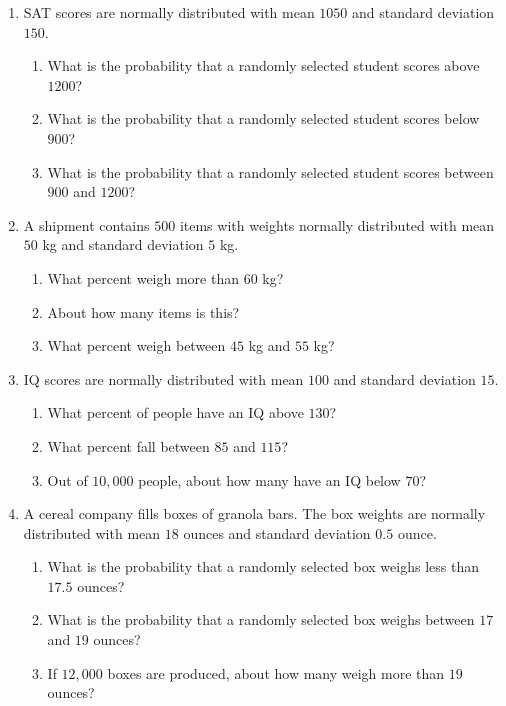 \documentclass[11pt]{article}
\newcommand{\answerline}{\vspace{1.2cm}}
\begin{document}
\begin{enumerate}[leftmargin=*, label=\textbf{\arabic*.}, start=4]

\item SAT scores are normally distributed with mean $1050$ and standard deviation $150$.
\begin{enumerate}[label=(\alph*)]
    \item What is the probability that a randomly selected student scores above $1200$? \answerline
    \item What is the probability that a randomly selected student scores below $900$? \answerline
    \item What is the probability that a randomly selected student scores between $900$ and $1200$? \answerline
\end{enumerate}

\item A shipment contains $500$ items with weights normally distributed with mean $50$ kg and standard deviation $5$ kg.
\begin{enumerate}[label=(\alph*)]
    \item What percent weigh more than $60$ kg? \answerline
    \item About how many items is this? \answerline
    \item What percent weigh between $45$ kg and $55$ kg? \answerline
\end{enumerate}

\item IQ scores are normally distributed with mean $100$ and standard deviation $15$.
\begin{enumerate}[label=(\alph*)]
    \item What percent of people have an IQ above $130$? \answerline
    \item What percent fall between $85$ and $115$? \answerline
    \item Out of $10{,}000$ people, about how many have an IQ below $70$? \answerline
\end{enumerate}

\item A cereal company fills boxes of granola bars. The box weights are normally distributed with mean $18$ ounces and standard deviation $0.5$ ounce.
\begin{enumerate}[label=(\alph*)]
    \item What is the probability that a randomly selected box weighs less than $17.5$ ounces? \answerline
    \item What is the probability that a randomly selected box weighs between $17$ and $19$ ounces? \answerline
    \item If $12{,}000$ boxes are produced, about how many weigh more than $19$ ounces? \answerline
\end{enumerate}

\end{enumerate}
\end{document}
